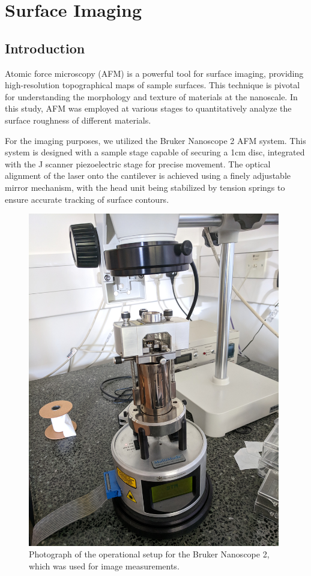 
\chapter{Surface Imaging}

\section{Introduction}

Atomic force microscopy (AFM) is a powerful tool for surface imaging, providing high-resolution topographical maps of sample surfaces. This technique is pivotal for understanding the morphology and texture of materials at the nanoscale. In this study, AFM was employed at various stages to quantitatively analyze the surface roughness of different materials.

For the imaging purposes, we utilized the Bruker Nanoscope 2 AFM system. This system is designed with a sample stage capable of securing a 1cm disc, integrated with the J scanner piezoelectric stage for precise movement. The optical alignment of the laser onto the cantilever is achieved using a finely adjustable mirror mechanism, with the head unit being stabilized by tension springs to ensure accurate tracking of surface contours.

\begin{figure}[h!!!!!!!]     %
        \begin{center}
          \includegraphics[width=110mm]{chapter2/ImageAFM.jpg}
\end{center}
\caption{Photograph of the operational setup for the Bruker Nanoscope 2, which was used for image measurements.}
\label{fig:ImageAFM}                 %
\end{figure}

